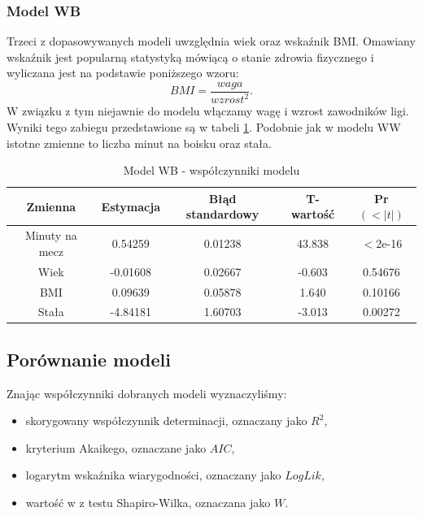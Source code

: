 \documentclass[11pt,a4paper]{article}
\begin{document}
\subsubsection{Model WB}
Trzeci z dopasowywanych modeli uwzględnia wiek oraz wskaźnik BMI. Omawiany wskaźnik jest popularną statystyką mówiącą o stanie zdrowia fizycznego i wyliczana jest na podstawie poniższego wzoru:
\begin{equation}
BMI = \frac{waga}{wzrost^2}.
\end{equation}
W związku z tym niejawnie do modelu włączamy wagę i wzrost zawodników ligi. Wyniki tego zabiegu przedstawione są w tabeli \ref{model_wb}. Podobnie jak w modelu WW istotne zmienne to liczba minut na boisku oraz stała. 
\begin{table}[H]
	\begin{tabular}{| c | c | c | c | c |}
		\hline
		Zmienna & Estymacja & Błąd standardowy & T-wartość & Pr$(<|t|)$\\ \hline
		Minuty na mecz & 0.54259 & 0.01238 & 43.838 & $<$2e-16\\ \hline
		Wiek & -0.01608 & 0.02667 & -0.603 & 0.54676\\ \hline 
		BMI & 0.09639 & 0.05878 & 1.640 & 0.10166\\ \hline  
		Stała & -4.84181 & 1.60703 & -3.013 & 0.00272\\ \hline	
	\end{tabular}
	\caption{Model WB - współczynniki modelu}
	\label{model_wb}
\end{table}
\subsection{Porównanie modeli}
Znając współczynniki dobranych modeli wyznaczyliśmy:
\begin{itemize}
	\item skorygowany współczynnik determinacji, oznaczany jako $R^2$,
	\item kryterium Akaikego, oznaczane jako $AIC$,
	\item logarytm wskaźnika wiarygodności, oznaczany jako $LogLik$,
	\item wartość w z testu Shapiro-Wilka, oznaczana jako $W$.
\end{itemize}
\end{document}
